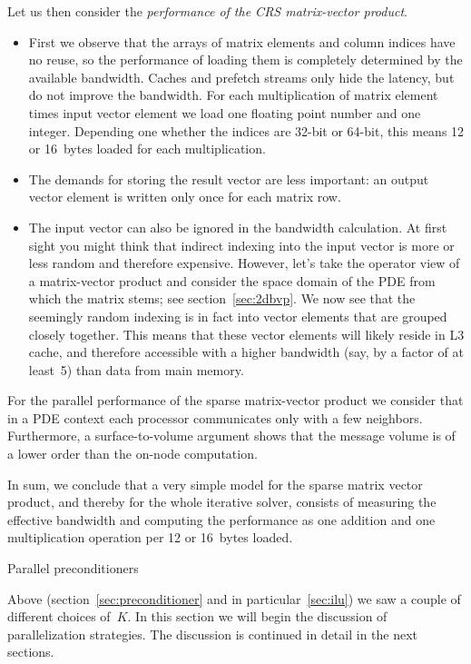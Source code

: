 Let us then consider the \emph{performance of the CRS matrix-vector
  product}.
\begin{itemize}
\item First we observe that the arrays of matrix elements and column indices have no reuse,
  so the performance of loading them is completely determined by the available bandwidth.
  Caches and prefetch streams only hide the latency, but do not improve the bandwidth.
  For
  each multiplication of matrix element times input vector element
  we load one floating point number and one integer. Depending one whether the
  indices are 32-bit or 64-bit, this means 12 or 16~bytes loaded for each multiplication.
\item The demands for storing the result vector are less important: an output vector
  element is written only once for each matrix row.
\item The input vector can also be ignored in the bandwidth calculation.
  At first sight you might think that indirect indexing
  into the input vector is more or less random and therefore expensive.
  However, let's take the operator view of a matrix-vector product
  and consider the space domain of the \ac{PDE} from which the matrix stems;
  see section~\ref{sec:2dbvp}. We now see that the seemingly random indexing
  is in fact into vector elements that are grouped closely together.
  This means that these vector elements will likely reside in L3 cache,
  and therefore accessible with a higher bandwidth (say, by a factor of at least~5)
  than data from main memory.
\end{itemize}
For the parallel performance of the sparse matrix-vector product we
consider that in a \ac{PDE} context each processor communicates only
with a few neighbors. Furthermore, a surface-to-volume argument
shows that the message volume is of a lower order than the on-node
computation.

In sum, we conclude that a very simple model for the sparse matrix vector product,
and thereby for the whole iterative solver, consists of measuring
the effective bandwidth and computing the performance as one
addition and one multiplication operation per 12 or 16~bytes loaded.

 {Parallel preconditioners}
\label{sec:parallel-prec}

Above (section~\ref{sec:preconditioner} and in particular~\ref{sec:ilu}) we saw a
couple of different choices of~$K$. In this section we will begin the
discussion of parallelization strategies. The discussion is continued
in detail in the next sections.

